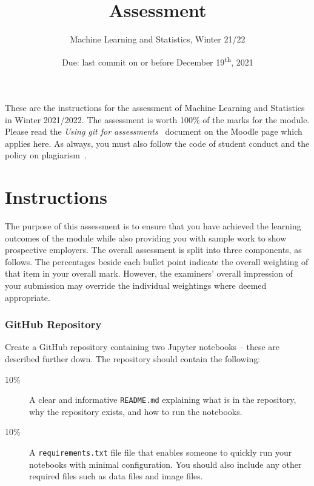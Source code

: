 \documentclass[a4paper, 12pt]{scrartcl}
\title{\vspace{-20mm}Assessment}
\author{Machine Learning and Statistics, Winter 21/22}
\date{Due: last commit on or before December 19\textsuperscript{th}, 2021\vspace{-6mm}}
\begin{document}
  
  \maketitle

  These are the instructions for the assessment of Machine Learning and Statistics in Winter 2021/2022.
  The assessment is worth 100\% of the marks for the module.
  Please read the \emph{Using git for assessments}~\cite{usinggit} document on the Moodle page which applies here.
  As always, you must also follow the code of student conduct and the policy on plagiarism~\cite{gmitqaf}.

  \section*{Instructions}
  
  The purpose of this assessment is to ensure that you have achieved the learning outcomes of the module while also providing you with sample work to show prospective employers.
  The overall assessment is split into three components, as follows.
  The percentages beside each bullet point indicate the overall weighting of that item in your overall mark.
  However, the examiners' overall impression of your submission may override the individual weightings where deemed appropriate.

  \subsubsection*{GitHub Repository}
  Create a GitHub repository containing two Jupyter notebooks -- these are described further down.
  The repository should contain the following:
  \begin{description}
    \item[10\%] A clear and informative \texttt{README.md} explaining what is in the repository, why the repository exists, and how to run the notebooks.
    \item[10\%] A \texttt{requirements.txt} file file that enables someone to quickly run your notebooks with minimal configuration. You should also include any other required files such as data files and image files.
  \end{description}
\end{document}
